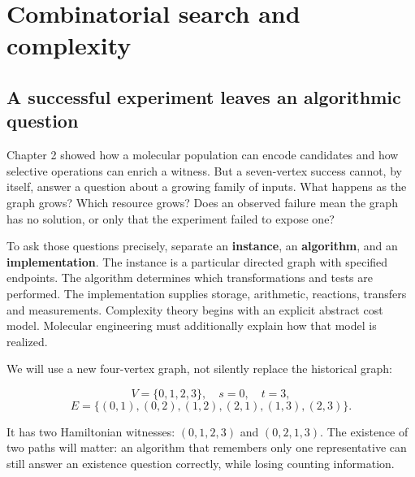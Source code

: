 \chapter{Combinatorial search and complexity}



\section{A successful experiment leaves an algorithmic
question}\label{a-successful-experiment-leaves-an-algorithmic-question}

Chapter 2 showed how a molecular population can encode candidates and
how selective operations can enrich a witness. But a seven-vertex
success cannot, by itself, answer a question about a growing family of
inputs. What happens as the graph grows? Which resource grows? Does an
observed failure mean the graph has no solution, or only that the
experiment failed to expose one?

To ask those questions precisely, separate an \textbf{instance}, an
\textbf{algorithm}, and an \textbf{implementation}. The instance is a
particular directed graph with specified endpoints. The algorithm
determines which transformations and tests are performed. The
implementation supplies storage, arithmetic, reactions, transfers and
measurements. Complexity theory begins with an explicit abstract cost
model. Molecular engineering must additionally explain how that model is
realized.

We will use a new four-vertex graph, not silently replace the historical
graph:

\begin{equation}
V=\{0,1,2,3\},\quad s=0,\quad t=3,
\end{equation} \begin{equation}
E=\{(0,1),(0,2),(1,2),(2,1),(1,3),(2,3)\}.
\end{equation}

It has two Hamiltonian witnesses: \((0,1,2,3)\) and \((0,2,1,3)\). The
existence of two paths will matter: an algorithm that remembers only one
representative can still answer an existence question correctly, while
losing counting information.

